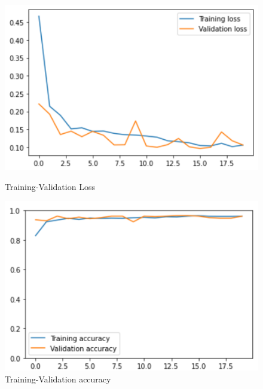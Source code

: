 \documentclass[11pt,a4paper]{article}
\theoremstyle{definition}
\begin{document}
\begin{figure}[H]
  \centering
  \begin{minipage}[b]{0.45\textwidth}
    \includegraphics[scale=0.75]{./images/vggloss}
	\caption{Training-Validation Loss}
  \end{minipage}
  \hfill
  \begin{minipage}[b]{0.45\textwidth}
    \includegraphics[scale=0.75]{./images/vggacc}
	\caption{Training-Validation accuracy}
  \end{minipage}
\end{figure}
\end{document}
